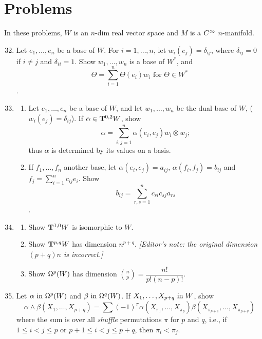 \documentclass[../main]{subfiles}
\begin{document}
\section*{Problems}
In these problems, $W$ is an $n$-dim real vector space and $M$ is a $\CInfty$ $n$-manifold.

\begin{enumerate}
    \setcounter{enumi}{31}
    \item\label{pro:32} Let $e_1,\dots,e_n$ be a base of $W$. For $i= 1,\dots,n$, let $w_i(e_j) = \delta_{ij}$, where $\delta_{ij} = 0$ if $i\ne j$ and $\delta_{ii} = 1$. Show $w_1,\dots,w_n$ is a base of $W^\ast$, and  \[\Theta = \sum_{i=1}^n \Theta(e_i)w_i\text{ for } \Theta \in W^\ast\]. 
    
    \item\label{pro:33} 
    \begin{enumerate}[label=(\roman*)]
        \item Let $e_1,\dots,e_n$ be a base of $W$, and let $w_1,\dots,w_n$ be the dual base of $W$, ($w_i(e_j) = \delta_{ij}$). If $\alpha \in \tensorbundle{W}{0}{2}$, show \[\alpha = \sum_{i,j=1}^n \alpha(e_i, e_j)w_i \otimes w_j;\] thus $\alpha$ is determined by its values on a basis.
        \item If $f_1,\dots,f_n$ another base, let $\alpha(e_i,e_j) = a_{ij}$, $\alpha(f_i, f_j) = b_{ij}$ and \newline $f_j = \displaystyle\sum_{i=1}^n c_{ij}e_i$. Show \[b_{ij} = \sum_{r,s=1}^n c_{ri} c_{sj}a_{rs}\].
    \end{enumerate}
      
    
    \item\label{pro:34} 
    \begin{enumerate}[label=(\roman*)]
        \item Show $\tensorbundle{W}{1}{0}$ is isomorphic to $W$.
        \item Show $\tensorbundle{W}{p}{q}$ has dimension $n^{p+q}$. \emph{[Editor's note: the original dimension $(p+q)n$ is incorrect.]}
        \item Show $\formbundle{W}{p}$ has dimension $\displaystyle\binom{n}{p} = \dfrac{n!}{p!(n-p)!}$.
    \end{enumerate}
      
    
    \item\label{pro:35} Let $\alpha \InText \formbundle{W}{p}$ and $\beta \InText \formbundle{W}{q}$. If $X_1,\dots,X_{p+q} \InText W$, show
    \[ \alpha\wedge\beta(X_1,\dots,X_{p+q}) = \sum(-1)^\pi\alpha(X_{\pi_1},\dots,X_{\pi_p})\beta(X_{\pi_{p+1}},\dots,X_{\pi_{p+q}})\]
    where the sum is over all \emph{shuffle} permutations $\pi$ for $p$ and $q$, i.e., if\newline $1\le i<j\le p$ or $p+1\le i < j \le p+q$, then $\pi_i < \pi_j$. 
    

\end{enumerate}
\end{document}
